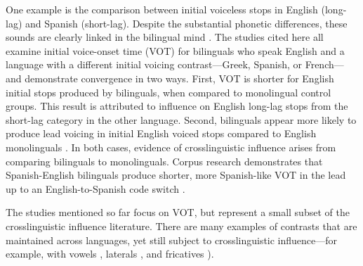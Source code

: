 One example is the comparison between initial voiceless stops in English (long-lag) and Spanish (short-lag). Despite the substantial phonetic differences, these sounds are clearly linked in the bilingual mind \citep{fricke_2016_phonetic, antoniou_2010_context, goldrick_2014_switching, sundara_2006_production}. The studies cited here all examine initial voice-onset time (VOT) for bilinguals who speak English and a language with a different initial voicing contrast---Greek, Spanish, or French---and demonstrate convergence in two ways. First, VOT is shorter for English initial stops produced by bilinguals, when compared to monolingual control groups. This result is attributed to influence on English long-lag stops from the short-lag category in the other language. Second, bilinguals appear more likely to produce lead voicing in initial English voiced stops compared to English monolinguals \citep{sundara_2006_production}. In both cases, evidence of crosslinguistic influence arises from comparing bilinguals to monolinguals. Corpus research demonstrates that Spanish-English bilinguals produce shorter, more Spanish-like VOT in the lead up to an English-to-Spanish code switch \citep{fricke_2016_phonetic, bullock_2009_sociophonetics}. 

The studies mentioned so far focus on VOT, but represent a small subset of the crosslinguistic influence literature. There are many examples of contrasts that are maintained across languages, yet still subject to crosslinguistic influence---for example, with vowels \citep{guion_2003_systems}, laterals \citep{amengual_2018_laterals,barlow_2014_aoa}, and fricatives \citep{peng_1993_influence}). %

